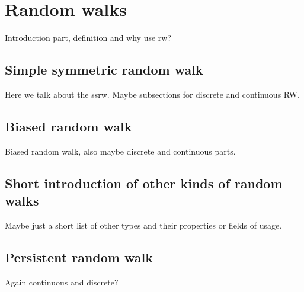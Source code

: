 \chapter{Random walks}\label{ch:ranWalks}
Introduction part, definition and why use rw?\newline
\lipsum[1-5]


\clearpage
\section{Simple symmetric random walk}\label{sec:ssrw}
Here we talk about the ssrw. Maybe subsections for discrete and continuous RW.\newline
\lipsum[1-3]


\section{Biased random walk}\label{sec:brw}
Biased random walk, also maybe discrete and continuous parts.\newline
\lipsum[1-3]


\section{Short introduction of other kinds of random walks}\label{sec:orw}
Maybe just a short list of other types and their properties or fields of usage.\newline
\lipsum[1-3]


\section{Persistent random walk}\label{sec:prw}
Again continuous and discrete?\newline
\lipsum[1-3]
